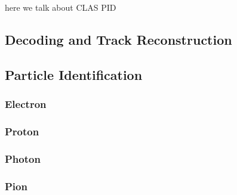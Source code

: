 here we talk about CLAS PID
\subsection{Decoding and Track Reconstruction}

\subsection{Particle Identification}
    \subsubsection{Electron}
    \subsubsection{Proton}
    \subsubsection{Photon}
    \subsubsection{Pion}

